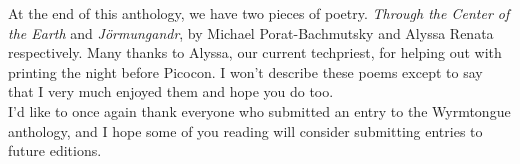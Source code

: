 \documentclass{picocon-fanzine}
\begin{document}
At the end of this anthology, we have two pieces of poetry. \textit{Through the Center of the Earth} and \textit{Jörmungandr}, by Michael Porat-Bachmutsky and Alyssa Renata respectively. Many thanks to Alyssa, our current techpriest, for helping out with printing the night before Picocon. I won't describe these poems except to say that I very much enjoyed them and hope you do too.\\
I'd like to once again thank everyone who submitted an entry to the Wyrmtongue anthology, and I hope some of you reading will consider submitting entries to future editions.
\endgroup






\end{document}
